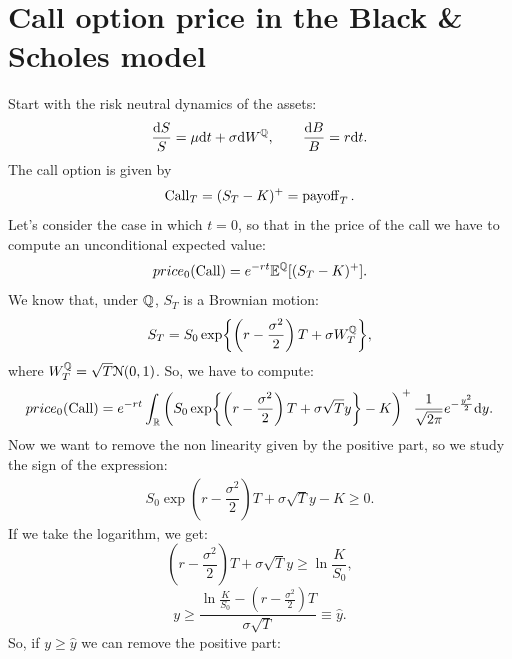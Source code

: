 \section{Call option price in the Black \& Scholes model}
Start with the risk neutral dynamics of the assets:
\begin{equation}
    \frac{\dd S}{S} = \mu\dd t + \sigma \dd W^{\mathbb{Q}}, \qquad \frac{\dd B}{B} = r\dd t.
\end{equation}
The call option is given by
\begin{equation}
    \operatorname{Call}_T = (S_T - K)^+ = \operatorname{payoff}_T.
\end{equation}
Let's consider the case in which $t=0$, so that in the price of the call we have to compute an unconditional expected value:
\begin{equation}
    price_0(\operatorname{Call}) = e^{-rt}\mathbb{E}^{\mathbb{Q}}[(S_T-K)^+].
\end{equation}
We know that, under $\mathbb{Q}$, $S_T$ is a Brownian motion:
\begin{equation}
    S_T = S_0\exp{\left(r-\dfrac{\sigma^2}{2}\right)T+\sigma W_T^{\mathbb{Q}}},
\end{equation}
where $W_T^{\mathbb{Q}}=\sqrt{T}\mathcal{N}(0,1)$. So, we have to compute:
\begin{equation}
    price_0(\operatorname{Call}) = e^{-rt}\int_{\mathbb{R}}\left(S_0\exp{\left(r-\dfrac{\sigma^2}{2}\right)T+\sigma \sqrt{T}y}-K\right)^+\frac{1}{\sqrt{2\pi}}e^{-\frac{y^2}{2}}\dd y.
\end{equation}
Now we want to remove the non linearity given by the positive part, so we study the sign of the expression:
\begin{align}
    S_0\exp{\left(r-\dfrac{\sigma^2}{2}\right)T+\sigma \sqrt{T}y}-K \ge 0.
\end{align}
If we take the logarithm, we get:
\begin{equation*}
    \left(r-\dfrac{\sigma^2}{2}\right)T+\sigma \sqrt{T}y \ge \ln\frac{K}{S_0},
\end{equation*}
\begin{equation*}
    y \ge \dfrac{\ln\frac{K}{S_0} - \left(r-\frac{\sigma^2}{2}\right)T}{\sigma\sqrt{T}} \equiv \hat{y}.
\end{equation*}
So, if $y\ge\hat{y}$ we can remove the positive part:
